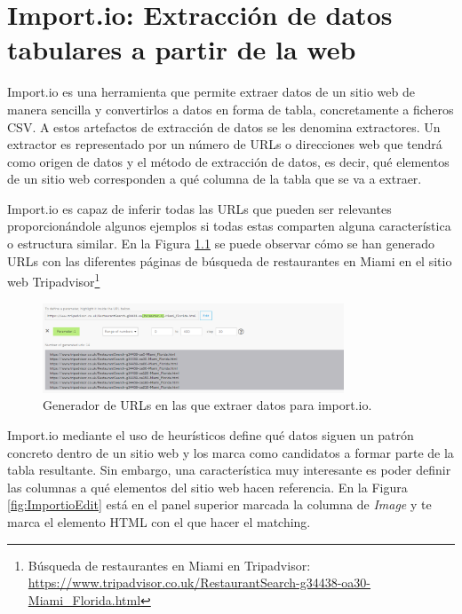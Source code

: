 \chapter{Import.io: Extracción de datos tabulares a partir de la web}
\label{anx:importio}

Import.io es una herramienta que permite extraer datos de un sitio web de manera sencilla y convertirlos a datos en forma de tabla, concretamente a ficheros CSV. A estos artefactos de extracción de datos se les denomina extractores. Un extractor es representado por un número de URLs o direcciones web que tendrá como origen de datos y el método de extracción de datos, es decir, qué elementos de un sitio web corresponden a qué columna de la tabla que se va a extraer.

Import.io es capaz de inferir todas las URLs que pueden ser relevantes proporcionándole algunos ejemplos si todas estas comparten alguna característica o estructura similar. En la Figura \ref{fig:ImportioURLs} se puede observar cómo se han generado URLs con las diferentes páginas de búsqueda de restaurantes en Miami en el sitio web Tripadvisor\footnote{Búsqueda de restaurantes en Miami en Tripadvisor: \url{https://www.tripadvisor.co.uk/RestaurantSearch-g34438-oa30-Miami_Florida.html}}

\begin{figure}[htb]
	\centering
	\includegraphics[width=0.8\textwidth]{./figs/ImportioURLs.png}
	\caption{Generador de URLs en las que extraer datos para import.io.}
	\label{fig:ImportioURLs}
\end{figure}

Import.io mediante el uso de heurísticos define qué datos siguen un patrón concreto dentro de un sitio web y los marca como candidatos a formar parte de la tabla resultante. Sin embargo, una característica muy interesante es poder definir las columnas a qué elementos del sitio web hacen referencia. En la Figura \ref{fig:ImportioEdit} está en el panel superior marcada la columna de \emph{Image} y te marca el elemento HTML con el que hacer el matching.


